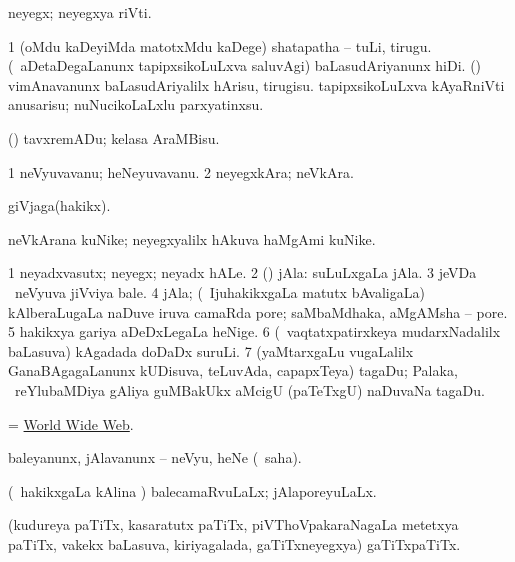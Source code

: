 \bentry
{} 
\gl{\nA}
\expl{}
\bmng
neyegx; neyegxya riVti. 
\emng
\eentry

\bentry
{} 
\gl{\akirx}
\expl{}
\bmng
\bnum
\num{1} (oMdu kaDeyiMda matotxMdu kaDege) shatapatha -- tuLi, tirugu. 
 (\kanmu\ aDetaDegaLanunx tapipxsikoLuLxva saluvAgi) baLasudAriyanunx hiDi. (\AmA) 
\banum
{} vimAnavanunx baLasudAriyalilx hArisu, tirugisu. 
 tapipxsikoLuLxva kAyaRniVti anusarisu; nuNucikoLaLxlu parxyatinxsu. 
\eanum
\numie
\enum
\emng

\noindent 
\gl{\pagu}
\expl{}
\bmng
{} (\ashi) tavxremADu; kelasa AraMBisu. 
\emng
\eentry

\bentry
{} 
\gl{\nA}
\expl{}
\bmng
\bnum
\num{1} neVyuvavanu; heNeyuvavanu. 
\num{2} neyegxkAra; neVkAra. 
\enum
\emng
\eentry

\bentry
{} 
\gl{\nA}
\expl{}
\bmng
giVjaga(hakikx). 
\emng
\eentry

\bentry
{} 
\gl{\nA}
\expl{}
\bmng
neVkArana kuNike; neyegxyalilx hAkuva haMgAmi kuNike. 
\emng
\eentry

\bentry
{} 
\gl{\nA}
\expl{}
\bmng
\bnum
\num{1} neyadxvasutx; neyegx; neyadx hALe. 
\num{2} (\rUpa) jAla:  suLuLxgaLa jAla. 
\num{3} jeVDa \mo\ neVyuva jiVviya bale. 
\num{4} jAla; (\kanmu\ IjuhakikxgaLa matutx bAvaligaLa) kAlberaLugaLa naDuve iruva camaRda pore; saMbaMdhaka, aMgAMsha -- pore. 
\num{5} hakikxya gariya aDeDxLegaLa heNige. 
\num{6} (\kanmu\ vaqtatxpatirxkeya mudarxNadalilx baLasuva) kAgadada doDaDx suruLi. 
\num{7} (yaMtarxgaLu \mo vugaLalilx GanaBAgagaLanunx kUDisuva, teLuvAda, capapxTeya) tagaDu; Palaka, \udA\ reYlubaMDiya gAliya guMBakUkx aMcigU (paTeTxgU) naDuvaNa tagaDu. 
\enum
\emng

\noindent 
\gl{\pagu}
\expl{}
\bmng
{} = \hyperlink{world wide web}{World Wide Web}. 
\emng
\eentry

\bentry
{} 
\gl{\sakirx}
\bmng
baleyanunx, jAlavanunx -- neVyu, heNe (\akirx\ saha). 
\emng
\eentry

\bentry
{} 
\gl{\gu}
\expl{}
\bmng
(\kanmu\ hakikxgaLa kAlina \vi) balecamaRvuLaLx; jAlaporeyuLaLx. 
\emng
\eentry

\bentry
{} 
\gl{\nA}
\expl{}
\bmng
(kudureya paTiTx, kasaratutx paTiTx, piVThoVpakaraNagaLa metetxya paTiTx, \mo vakekx baLasuva, kiriyagalada, gaTiTxneyegxya) gaTiTxpaTiTx. 
\emng
\eentry

